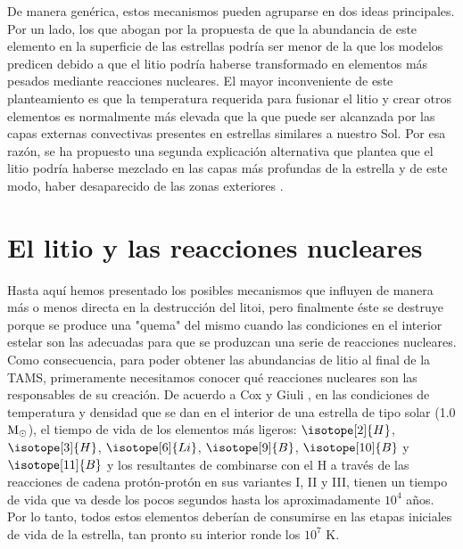 De manera genérica, estos mecanismos pueden agruparse en dos ideas principales. Por un lado, los que abogan por la propuesta de que la abundancia de este elemento en la superficie de las estrellas podría ser menor de la que los modelos predicen debido a que el litio podría haberse transformado en elementos más pesados mediante reacciones nucleares. El mayor inconveniente de este planteamiento es que la temperatura requerida para fusionar el litio y crear otros elementos es normalmente más elevada que la que puede ser alcanzada por las capas externas convectivas presentes en estrellas similares a nuestro Sol. Por esa razón, se ha propuesto una segunda explicación alternativa que plantea que el litio podría haberse mezclado en las capas más profundas de la estrella y de este modo, haber desaparecido de las zonas exteriores \citep{Pinsonneault1997}.\par



\section{El litio y las reacciones nucleares} \label{sec:li_reac_nuc}
Hasta aquí hemos presentado los posibles mecanismos que influyen de manera más o menos directa en la destrucción del litoi, pero finalmente éste se destruye porque se produce una "quema" del mismo cuando las condiciones en el interior estelar son las adecuadas para que se produzcan una serie de reacciones nucleares. Como consecuencia, para poder obtener las abundancias de litio al final de la TAMS, primeramente necesitamos conocer qué reacciones nucleares son las responsables de su creación. De acuerdo a Cox y Giuli \citep{Cox1968}, en las condiciones de temperatura y densidad que se dan en el interior de una estrella de tipo solar (1.0 $\mathrm{M}_\odot$), el tiempo de vida de los elementos más ligeros: $\isotope[2]{H}$, $\isotope[3]{H}$, $\isotope[6]{Li}$, $\isotope[9]{B}$, $\isotope[10]{B}$ y $\isotope[11]{B}$ y los resultantes de combinarse con el H a través de las reacciones de cadena protón-protón en sus variantes I, II y III, tienen un tiempo de vida que va desde los pocos segundos hasta los aproximadamente $10^4$ años. Por lo tanto, todos estos elementos deberían de consumirse en las etapas iniciales de vida de la estrella, tan pronto su interior ronde los $10^7$ K.\par

